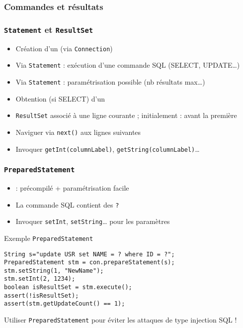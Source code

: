 \documentclass[english, french]{beamer}
\begin{document}
\subsubsection{Commandes et résultats}
\begin{frame}
	\frametitle{\texttt{Statement} et \texttt{ResultSet}}
	\begin{itemize}
		\item Création d’un  (via \texttt{Connection})
		\item Via \texttt{Statement} : exécution d’une commande SQL (SELECT, UPDATE…)
		\item Via \texttt{Statement} : paramétrisation possible (nb résultats max…)
		\item Obtention (si SELECT) d’un 
		\item \texttt{ResultSet} associé à une ligne courante ; initialement : avant la première
		\item Naviguer via \texttt{next()} aux lignes suivantes
		\item Invoquer \texttt{getInt(columnLabel)}, \texttt{getString(columnLabel)}…
	\end{itemize}
\end{frame}

\begin{frame}[fragile]
	\frametitle{\texttt{PreparedStatement}}
	\begin{itemize}
		\item {} : précompilé + paramétrisation facile
		\item La commande SQL contient des \og{}\texttt{?}\fg{}
		\item Invoquer \texttt{setInt}, \texttt{setString}… pour les paramètres
	\end{itemize}
	\begin{exampleblock}{Exemple \texttt{PreparedStatement}}
		\begin{lstlisting}[basicstyle=\small\NoAutoSpacing\ttfamily, aboveskip=0pt, belowskip=0pt, showstringspaces=false]
String s="update USR set NAME = ? where ID = ?";
PreparedStatement stm = con.prepareStatement(s);
stm.setString(1, "NewName");
stm.setInt(2, 1234);
boolean isResultSet = stm.execute();
assert(!isResultSet);
assert(stm.getUpdateCount() == 1);
		\end{lstlisting}
	\end{exampleblock}
	Utiliser \texttt{PreparedStatement} pour éviter les attaques de type injection SQL !
\end{frame}
\end{document}
